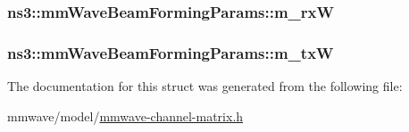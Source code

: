 \subsubsection[{\texorpdfstring{m\+\_\+rxW}{m_rxW}}]{ ns3\+::mm\+Wave\+Beam\+Forming\+Params\+::m\+\_\+rxW}\hypertarget{structns3_1_1mmWaveBeamFormingParams_adeec98608a7bf0b20e6718fa6d5f3e48}{}\label{structns3_1_1mmWaveBeamFormingParams_adeec98608a7bf0b20e6718fa6d5f3e48}
\subsubsection[{\texorpdfstring{m\+\_\+txW}{m_txW}}]{ ns3\+::mm\+Wave\+Beam\+Forming\+Params\+::m\+\_\+txW}\hypertarget{structns3_1_1mmWaveBeamFormingParams_ac1886cb4a6495aaee7df49b78c79c603}{}\label{structns3_1_1mmWaveBeamFormingParams_ac1886cb4a6495aaee7df49b78c79c603}


The documentation for this struct was generated from the following file\+:\begin{DoxyCompactItemize}
\item 
mmwave/model/\hyperlink{mmwave-channel-matrix_8h}{mmwave-\/channel-\/matrix.\+h}\end{DoxyCompactItemize}
